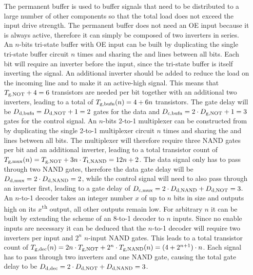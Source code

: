 \begin{itemize}
    The permanent buffer is used to buffer signals that need to be distributed to a large number of other components so that the total load does not exceed the input drive strength. The permanent buffer does not need an \ac{OE} input because it is always active, therefore it can simply be composed of two inverters in series.
    An $n$-bits tri-state buffer with \ac{OE} input can be built by duplicating the single tri-state buffer circuit\cite[Figure 4]{asakura2003tri} $n$ times and sharing the  and  lines between all bits. Each bit will require an inverter before the input, since the tri-state buffer is itself inverting the signal. An additional inverter should be added to reduce the load on the incoming  line and to make it an active-high signal. This means that $\f{T}{g}{NOT} + 4 = 6$ transistors are needed per bit together with an additional two inverters, leading to a total of $\f{T}{g}{bufn}(n) = 4 + 6n$ transistors. The gate delay will be $\f{D}{d}{bufn} = \f{D}{d}{NOT} + 1 = 2$ gates for the data and $\f{D}{c}{bufn} = 2 \cdot \f{D}{g}{NOT} + 1 = 3$ gates for the control signal.
    An $n$-bits 2-to-1 multiplexer can be constructed from by duplicating the single 2-to-1 multiplexer circuit\cite[Figure 4]{7375632} $n$ times and sharing the  and  lines between all bits. The multiplexer will therefore require three NAND gates per bit and an additional inverter, leading to a total transistor count of $\f{T}{g}{mux}(n) = \f{T}{g}{NOT} + 3n \cdot \f{T}{t}{NAND} = 12n + 2$. The data signal only has to pass through two NAND gates, therefore the data gate delay will be $\f{D}{d}{mux} = 2 \cdot \f{D}{d}{NAND} = 2$, while the control signal will need to also pass through an inverter first, leading to a gate delay of $\f{D}{c}{mux} = 2 \cdot \f{D}{d}{NAND} + \f{D}{d}{NOT} = 3$.
    An $n$-to-1 decoder takes an integer number $x$ of up to $n$ bits in size and outputs high on its $x$\textsuperscript{th} output, all other outputs remain low. For arbitrary $n$ it can be built by extending the scheme of an 8-to-1 decoder\cite{74x138} to $n$ inputs. Since no enable inputs are necessary it can be deduced that the $n$-to-1 decoder will require two inverters per input and $2^{n}$ $n$-input NAND gates. This leads to a total transistor count of $\f{T}{g}{dec}(n) = 2n \cdot \f{T}{g}{NOT} + 2^{n} \cdot \f{T}{g}{NAND}(n) = (4 + 2^{n+1}) \cdot n$. Each signal has to pass through two inverters and one NAND gate, causing the total gate delay to be $\f{D}{d}{dec} = 2 \cdot \f{D}{d}{NOT} + \f{D}{d}{NAND} = 3$.

\end{itemize}
